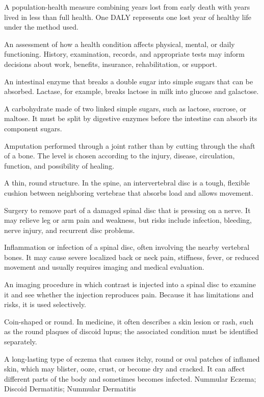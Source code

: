  A population-health measure combining years lost from early death with years lived in less than full health. One DALY represents one lost year of healthy life under the method used.

 An assessment of how a health condition affects physical, mental, or daily functioning. History, examination, records, and appropriate tests may inform decisions about work, benefits, insurance, rehabilitation, or support.

 An intestinal enzyme that breaks a double sugar into simple sugars that can be absorbed. Lactase, for example, breaks lactose in milk into glucose and galactose.

 A carbohydrate made of two linked simple sugars, such as lactose, sucrose, or maltose. It must be split by digestive enzymes before the intestine can absorb its component sugars.

 Amputation performed through a joint rather than by cutting through the shaft of a bone. The level is chosen according to the injury, disease, circulation, function, and possibility of healing.

 A thin, round structure. In the spine, an intervertebral disc is a tough, flexible cushion between neighboring vertebrae that absorbs load and allows movement.

 Surgery to remove part of a damaged spinal disc that is pressing on a nerve. It may relieve leg or arm pain and weakness, but risks include infection, bleeding, nerve injury, and recurrent disc problems.

 Inflammation or infection of a spinal disc, often involving the nearby vertebral bones. It may cause severe localized back or neck pain, stiffness, fever, or reduced movement and usually requires imaging and medical evaluation.

 An imaging procedure in which contrast is injected into a spinal disc to examine it and see whether the injection reproduces pain. Because it has limitations and risks, it is used selectively.

 Coin-shaped or round. In medicine, it often describes a skin lesion or rash, such as the round plaques of discoid lupus; the associated condition must be identified separately.

 A long-lasting type of eczema that causes itchy, round or oval patches of inflamed skin, which may blister, ooze, crust, or become dry and cracked. It can affect different parts of the body and sometimes becomes infected.
\synonyms
Nummular Eczema; Discoid Dermatitis; Nummular Dermatitis

